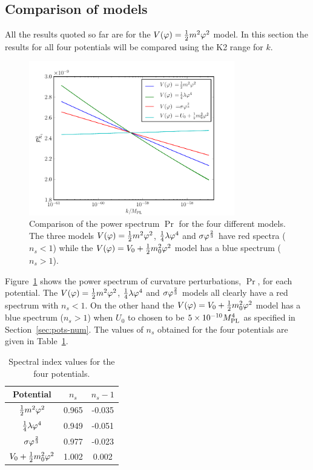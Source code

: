 \subsection{Comparison of models}
\label{sec:compare-res}
All the results quoted so far are for the $V(\varphi)=\frac{1}{2} m^2 \varphi^2$ model. In this section
the results for all four potentials will be compared using the K2 range for $k$. 
% 
% 
\begin{figure}
 \centering
\includegraphics[width=0.8\textwidth]{numerical/graphs/cmp_Pr_allks-large}
\caption[Comparison of $\Pr$ for models]{Comparison of the power spectrum $\Pr$ for
the four different models. The three models $V(\varphi)=\frac{1}{2} m^2 \varphi^2$, $\frac{1}{4}\lambda\varphi^4$ and
$\sigma\varphi^{\frac{2}{3}}$ have red spectra ($n_s <1$) while the $V(\varphi) = V_0 + \frac{1}{2} m_0^2 \varphi^2$
model has a blue spectrum ($n_s>1$).}
\label{fig:cmp-Pr}
\end{figure}
% 
Figure~\ref{fig:cmp-Pr} shows the power spectrum of curvature perturbations, $\Pr$, for each
potential. The $V(\varphi)=\frac{1}{2} m^2 \varphi^2$, $\frac{1}{4}\lambda\varphi^4$ and $\sigma\varphi^{\frac{2}{3}}$ models all clearly have
a red spectrum with $n_s <1$. On the other hand the $V(\varphi)=V_0 + \frac{1}{2} m_0^2 \varphi^2$ model has a blue
spectrum ($n_s>1$) when $U_0$ to chosen to be $5\times 10^{-10}M_{\mathrm{PL}}^4$ as specified in
Section~\ref{sec:pots-num}. 
% 
The values of $n_s$ obtained for the four potentials are given in Table~\ref{table:ns-res}. 
% 
\begin{table}
\begin{center}
\begin{tabular}{|c|c|c|}
\hline Potential & $n_s$ & $n_s - 1$ \\
\hline
$\frac{1}{2} m^2 \varphi^2$ & 0.965 & -0.035 \\ 
\hline
$\frac{1}{4}\lambda\varphi^4$ & 0.949 & -0.051 \\
\hline 
$\sigma\varphi^{\frac{2}{3}}$ & 0.977 & -0.023 \\
\hline 
$V_0 + \frac{1}{2} m_0^2 \varphi^2$ & 1.002 & 0.002 \\
\hline
\end{tabular}
\caption{Spectral index values for the four potentials.}
\label{table:ns-res}
\end{center}
\end{table}


